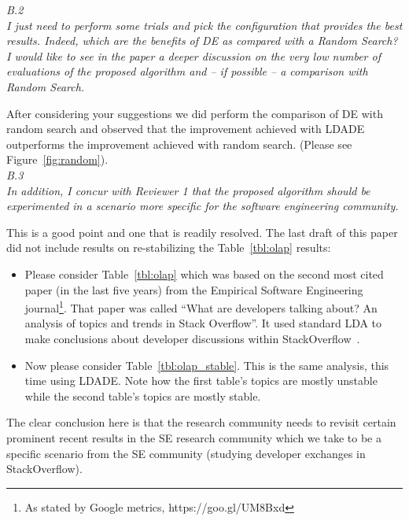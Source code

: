 \documentclass[twocolumn,5p,sort&compress]{elsarticle}
\newcommand{\bi}{\begin{itemize}}
\newcommand{\ei}{\end{itemize}}
\theoremstyle{break}
\begin{document}
\textit{B.2\\}
{\em I just need to perform some trials and pick the configuration that provides the best results. Indeed, which are the benefits of DE as compared with a Random Search? I would like to see in the paper a deeper discussion on the very low number of evaluations of the proposed algorithm and – if possible – a comparison with Random Search.\\}

After considering your suggestions we did perform the comparison of DE with random search and observed that the improvement achieved with LDADE outperforms the improvement achieved with random search. (Please see Figure~\ref{fig:random}).\\

\textit{B.3\\}
{\em In addition, I concur with Reviewer 1 that the proposed algorithm should be experimented in a scenario more specific for the software engineering community.\\}

This is a good point  and one that is readily resolved.
The last draft of this paper did not include results
on re-stabilizing the Table~\ref{tbl:olap} results:
\bi
\item
Please consider
Table~\ref{tbl:olap} which was based on   the second most cited paper (in the last five years) from the Empirical Software Engineering
journal\footnote{As stated by Google metrics, https://goo.gl/UM8Bxd}.
That paper was called   ``What are developers talking about? An analysis of topics and trends in Stack Overflow''. It used
standard LDA to make   conclusions about developer discussions
within StackOverflow~\cite{barua2014developers}. 
\item
Now please consider Table~\ref{tbl:olap_stable}.
This is the same analysis, this time using LDADE.
Note how the first table's topics are mostly unstable
while the second table's topics are mostly stable.
\ei
The clear conclusion here is that the research community
needs to revisit certain    prominent recent results in the SE
research community which we take to be a specific
scenario from the SE community (studying developer
exchanges in StackOverflow). 



\end{document}
